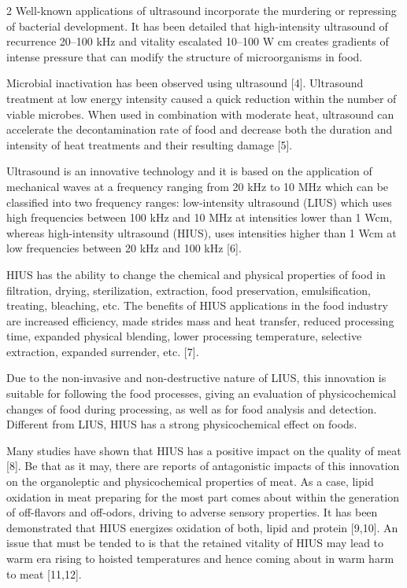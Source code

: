 \begin{multicols}{2}
Well-known applications of ultrasound incorporate the murdering or
repressing of bacterial development. It has been detailed that
high-intensity ultrasound of recurrence 20--100 kHz and vitality
escalated 10--100 W cm creates gradients of intense
pressure that can modify the structure of microorganisms in food.

Microbial inactivation has been observed using ultrasound {[}4{]}.
Ultrasound treatment at low energy intensity caused a quick reduction
within the number of viable microbes. When used in combination with
moderate heat, ultrasound can accelerate the decontamination rate of
food and decrease both the duration and intensity of heat treatments and
their resulting damage {[}5{]}.

Ultrasound is an innovative technology and it is based on the
application of mechanical waves at a frequency ranging from 20 kHz to 10
MHz which can be classified into two frequency ranges: low-intensity
ultrasound (LIUS) which uses high frequencies between 100 kHz and 10 MHz
at intensities lower than 1 Wcm, whereas
high-intensity ultrasound (HIUS), uses intensities higher than 1
Wcm at low frequencies between 20 kHz and 100 kHz
{[}6{]}.

HIUS has the ability to change the chemical and physical properties of
food in filtration, drying, sterilization, extraction, food
preservation, emulsification, treating, bleaching, etc. The benefits of
HIUS applications in the food industry are increased efficiency, made
strides mass and heat transfer, reduced processing time, expanded
physical blending, lower processing temperature, selective extraction,
expanded surrender, etc. {[}7{]}.

Due to the non-invasive and non-destructive nature of LIUS, this
innovation is suitable for following the food processes, giving an
evaluation of physicochemical changes of food during processing, as well
as for food analysis and detection. Different from LIUS, HIUS has a
strong physicochemical effect on foods.

Many studies have shown that HIUS has a positive impact on the quality
of meat {[}8{]}. Be that as it may, there are reports of antagonistic
impacts of this innovation on the organoleptic and physicochemical
properties of meat. As a case, lipid oxidation in meat preparing for
the most part comes about within the generation of off-flavors and
off-odors, driving to adverse sensory properties. It has been
demonstrated that HIUS energizes oxidation of both, lipid and protein
{[}9,10{]}. An issue that must be tended to is that the retained
vitality of HIUS may lead to warm era rising to hoisted temperatures
and hence coming about in warm harm to meat {[}11,12{]}.


\end{multicols}
